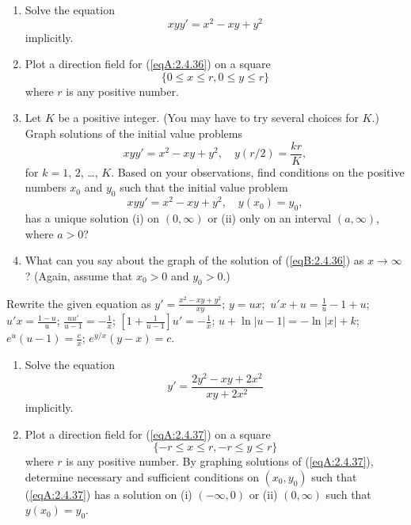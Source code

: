 \documentclass{ximera}
\begin{document}
\begin{problem}\label{exer:2.4.36}
\begin{enumerate}
\item %
Solve the equation
\begin{equation}\label{eqA:2.4.36}
xyy'=x^2-xy+y^2
\end{equation}
implicitly.
\item %
Plot a direction field for (\ref{eqA:2.4.36}) on a square
$$
\{0\leq x\leq r,0\leq y\leq r\}
$$
where $r$ is any positive number.
\item %
Let $K$ be a positive integer. (You may have to try several
choices for $K$.)
Graph solutions of the initial value problems
$$
xyy'=x^2-xy+y^2,\quad y(r/2)=\frac{kr}{K},
$$
for $k=1$, $2$, \dots, $K$. Based on your observations, find
 conditions on the positive numbers $x_0$
and $y_0$ such that the initial value problem
\begin{equation}\label{eqB:2.4.36}
xyy'=x^2-xy+y^2,\quad y(x_0)=y_0,
\end{equation}
has  a unique solution (i) on $(0,\infty)$   or (ii) only
on an interval  $(a,\infty)$, where $a>0$?
\item %
What can you say about the graph of the solution of (\ref{eqB:2.4.36})
as $x\to\infty$? (Again, assume that $x_0>0$ and $y_0>0$.)
\end{enumerate}



\begin{solution}
    Rewrite the given equation as $y'=\frac{x^2-xy+y^2}{ xy}$;\;
$y=ux$;\ $u'x+u=\frac{1}{ u}-1+u$;\;
$u'x=\frac{1-u}{ u}$;\;
$\frac{uu'}{ u-1}=-\frac{1}{ x}$;\;
$\left[1+\frac{1}{ u-1}\right]u'=-\frac{1}{ x}$;\;
$u+\ln|u-1|=-\ln|x|+k$;\;
$e^u(u-1)=\frac{c}{ x}$;\;
$e^{y/x}(y-x)=c$.
\end{solution}
\end{problem}

\begin{problem}\label{exer:2.4.37}
\begin{enumerate}
\item %
Solve the equation
\begin{equation}\label{eqA:2.4.37}
y'=\frac{2y^2-xy+2x^2}{xy+2x^2}
\end{equation}
implicitly.
\item %
Plot a direction field for (\ref{eqA:2.4.37}) on a square
$$
\{-r\leq x\leq r,-r\leq y\leq r\}
$$
where $r$ is any positive number. By graphing solutions of (\ref{eqA:2.4.37}),
determine necessary and sufficient conditions on $(x_0,y_0)$ such that
(\ref{eqA:2.4.37}) has a solution on (i) $(-\infty,0)$ or (ii) $(0,\infty)$ such that
$y(x_0)=y_0$.
\end{enumerate}
\end{problem}
\end{document}

